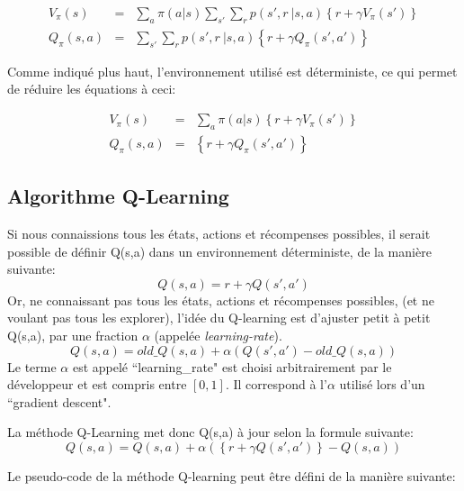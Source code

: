 \documentclass[11pt,a4paper]{report}
\begin{document}
    \begin{eqnarray}
      V_\pi(s) &=& \sum_a\pi(a|s)\sum_{s'}\sum_rp(s',r\ |s,a)\left\{r+\gamma V_\pi(s')\right\} \\
      Q_\pi(s,a) &=& \sum_{s'}\sum_rp(s',r\ |s,a)\left\{r+\gamma Q_\pi(s',a')\right\}
    \end{eqnarray}
    
    \par Comme indiqué plus haut, l'environnement utilisé est déterministe, ce qui permet de réduire les équations à ceci: 
    
    \begin{eqnarray}
      V_\pi(s) &=& \sum_a\pi(a|s)\left\{r+\gamma V_\pi(s')\right\} \\
      Q_\pi(s,a) &=& \left\{r+\gamma Q_\pi(s',a')\right\}
    \end{eqnarray}
    
  \subsection{Algorithme Q-Learning}
  
   \par Si nous connaissions tous les états, actions et récompenses possibles, il serait possible de définir Q(s,a) dans un environnement déterministe, de la manière suivante: 
    $$Q(s,a) = r +  \gamma Q(s',a')$$
    Or, ne connaissant pas tous les états, actions et récompenses possibles, (et ne voulant pas tous les explorer), l'idée du Q-learning est d'ajuster petit à petit Q(s,a), par une fraction $\alpha$ (appelée \textit{learning-rate}).  
    $$Q(s,a) = old\_Q(s,a) + \alpha(Q(s',a') - old\_Q(s,a))$$
    Le terme $\alpha$ est appelé ``learning\_rate" est choisi arbitrairement par le développeur et est compris entre $[0,1]$. Il correspond à l'$\alpha$ utilisé lors d'un ``gradient descent". 
 
    \newpage   
    \par La méthode Q-Learning met donc Q(s,a) à jour selon la formule suivante: 
    $$Q(s,a) = Q(s,a) + \alpha(\left\{  r + \gamma Q(s', a') \right\} - Q(s,a) )$$  
    
    \par Le pseudo-code de la méthode Q-learning peut être défini de la manière suivante: 
  
\end{document}
